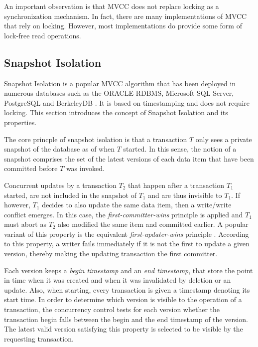 An important observation is that MVCC does not replace locking as a
synchronization mechanism. In fact, there are many implementations of MVCC that
rely on locking. However, most implementations do provide some form of lock-free
read operations.

\subsection{Snapshot Isolation}

Snapshot Isolation \cite{berenson1995critique} is a popular MVCC algorithm that
has been deployed in numerous databases such as the ORACLE RDBMS, Microsoft SQL
Server, PostgreSQL and BerkeleyDB \cite{cahill2009serializable}. It is based on
timestamping and does not require locking. This section introduces the concept
of Snapshot Isolation and its properties.

The core princple of snapshot isolation is that a transaction $T$ only sees a
private snapshot of the database as of when $T$ started. In this sense, the
notion of a snapshot comprises the set of the latest versions of each data item
that have been committed before $T$ was invoked.

Concurrent updates by a transaction $T_2$ that happen after a transaction $T_1$
started, are not included in the snapshot of $T_1$ and are thus invisible to
$T_1$. If however, $T_1$ decides to also update the same data item, then a
write/write conflict emerges. In this case, the \textit{first-committer-wins}
principle is applied and $T_1$ must abort as $T_2$ also modified the same item
and committed earlier. A popular variant of this property is the equivalent
\textit{first-updater-wins} principle \cite{fekete2004read, larson2011high}.
According to this property, a writer fails immediately if it is not the first to
update a given version, thereby making the updating transaction the first
committer.

Each version keeps a \textit{begin timestamp} and an \textit{end timestamp},
that store the point in time when it was created and when it was invalidated by
deletion or an update. Also, when starting, every transaction is given a
timestamp denoting its start time. In order to determine which version is
visible to the operation of a transaction, the concurrency control tests for
each version whether the transaction begin falls between the begin and the end
timestamp of the version. The latest valid version satisfying this property is
selected to be visible by the requesting transaction.

